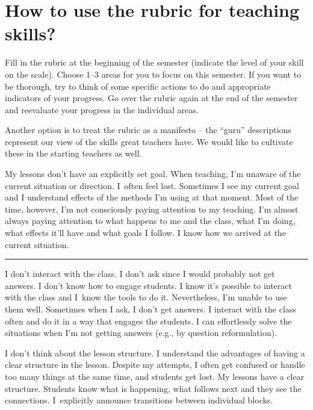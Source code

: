 \section*{How to use the rubric for teaching skills?}

Fill in the rubric at the beginning of the semester (indicate the level of your skill on the scale). Choose 1--3 areas for you to focus on this semester. If you want to be thorough, try to think of some specific actions to do and appropriate indicators of your progress. Go over the rubric again at the end of the semester and reevaluate your progress in the individual areas.

Another option is to treat the rubric as a manifesto -- the \enquote{guru} descriptions represent our view of the skills great teachers have. We would like to cultivate these in the starting teachers as well.


\newpage
{}
{My lessons don't have an explicitly set goal. When teaching, I'm unaware of the current situation or direction. I~often feel lost.}
{Sometimes I see my current goal and I understand effects of the methods I'm using at that moment. Most of the time, however, I'm not consciously paying attention to my teaching.}
{I'm almost always paying attention to what happens to me and the class, what I'm doing, what effects it'll have and what goals I follow. I know how we arrived at the current situation.}

\rule{\textwidth}{0.4pt}
{I don't interact with the class. I don't ask since I would probably not get answers. I don't know how to engage students.}
{I know it's possible to interact with the class and I~know the tools to do it. Nevertheless, I'm unable to use them well. Sometimes when I ask, I don't get answers.}
{I interact with the class often and do it in a way that engages the students. I can effortlessly solve the situations when I'm not getting answers (e.g., by question reformulation).}

\newpage
{}
{I don't think about the lesson structure.}
{I understand the advantages of having a clear structure in the lesson. Despite my attempts, I often get confused or handle too many things at the same time, and students get lost.}
{My lessons have a clear structure. Students know what is happening, what follows next and they see the connections. I~explicitly announce transitions between individual blocks.}

